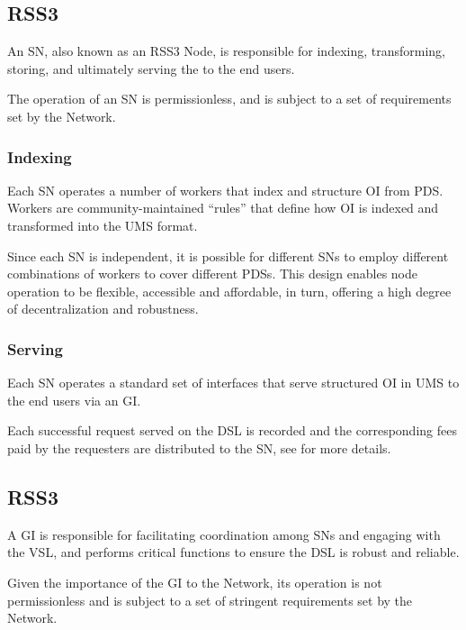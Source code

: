 \subsection{RSS3 }
\label{subsec:SN}

An \gls{SN}, also known as an RSS3 Node, is responsible for indexing, transforming, storing, and ultimately serving the  to the end users.

The operation of an \gls{SN} is permissionless, and is subject to a set of requirements set by the Network.

\subsubsection{Indexing}
Each \gls{SN} operates a number of workers that index and structure \gls{OI} from \gls{PDS}.
Workers are community-maintained ``rules'' that define how \gls{OI} is indexed and transformed into the \gls{UMS} format.

Since each \gls{SN} is independent, it is possible for different \glspl{SN} to employ different combinations of workers to cover different \glspl{PDS}.
This design enables node operation to be flexible, accessible and affordable, in turn, offering a high degree of decentralization and robustness.

\subsubsection{Serving}
Each \gls{SN} operates a standard set of interfaces that serve structured \gls{OI} in \gls{UMS} to the end users via an \gls{GI}.

Each successful request served on the \gls{DSL} is recorded and the corresponding fees paid by the requesters are distributed to the \gls{SN}, see  for more details.

\subsection{RSS3 }
\label{subsec:GI}

A \gls{GI} is responsible for facilitating coordination among \glspl{SN} and engaging with the \gls{VSL}, and performs critical functions to ensure the \gls{DSL} is robust and reliable.

Given the importance of the \gls{GI} to the Network, its operation is not permissionless and is subject to a set of stringent requirements set by the Network.

